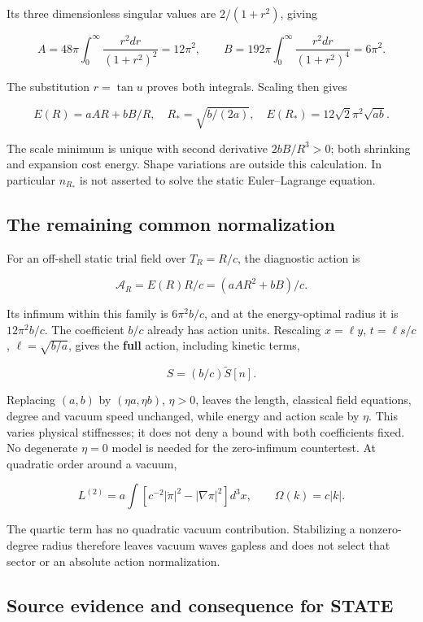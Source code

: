 \documentclass[11pt,a4paper]{article}
\begin{document}
Its three dimensionless singular values are \(2/(1+r^2)\), giving

\[A=48\pi\int_0^\infty\frac{r^2dr}{(1+r^2)^2}=12\pi^2,\qquad
B=192\pi\int_0^\infty\frac{r^2dr}{(1+r^2)^4}=6\pi^2.\]

The substitution \(r=\tan u\) proves both integrals. Scaling then gives

\[E(R)=aAR+bB/R,\quad R_* =\sqrt{b/(2a)},\quad
E(R_*)=12\sqrt2\pi^2\sqrt{ab}.\]

The scale minimum is unique with second derivative \(2bB/R^3>0\); both
shrinking and expansion cost energy. Shape variations are outside this
calculation. In particular \(n_{R_*}\) is not asserted to solve the
static Euler--Lagrange equation.

\hypertarget{the-remaining-common-normalization}{%
\subsection{The remaining common
normalization}\label{the-remaining-common-normalization}}

For an off-shell static trial field over \(T_R=R/c\), the diagnostic
action is

\[\mathcal A_R=E(R)R/c=(aAR^2+bB)/c.\]

Its infimum within this family is \(6\pi^2b/c\), and at the
energy-optimal radius it is \(12\pi^2b/c\). The coefficient \(b/c\)
already has action units. Rescaling \(x=\ell y\), \(t=\ell s/c\),
\(\ell=\sqrt{b/a}\), gives the \textbf{full} action, including kinetic
terms,

\[S=(b/c)\widetilde S[n].\]

Replacing \((a,b)\) by \((\eta a,\eta b)\), \(\eta>0\), leaves the
length, classical field equations, degree and vacuum speed unchanged,
while energy and action scale by \(\eta\). This varies physical
stiffnesses; it does not deny a bound with both coefficients fixed. No
degenerate \(\eta=0\) model is needed for the zero-infimum countertest.
At quadratic order around a vacuum,

\[L^{(2)}=a\int[c^{-2}|\dot\pi|^2-|\nabla\pi|^2]d^3x,\qquad
\Omega(k)=c|k|.\]

The quartic term has no quadratic vacuum contribution. Stabilizing a
nonzero-degree radius therefore leaves vacuum waves gapless and does not
select that sector or an absolute action normalization.

\hypertarget{source-evidence-and-consequence-for-state}{%
\subsection{Source evidence and consequence for
STATE}\label{source-evidence-and-consequence-for-state}}
\end{document}
